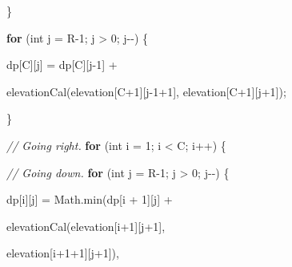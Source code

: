 \documentclass[
]{article}
\newenvironment{Shaded}{}{}
\newcommand{\BuiltInTok}[1]{#1}
\newcommand{\CommentTok}[1]{\textcolor[rgb]{0.38,0.63,0.69}{\textit{#1}}}
\newcommand{\ControlFlowTok}[1]{\textcolor[rgb]{0.00,0.44,0.13}{\textbf{#1}}}
\newcommand{\DataTypeTok}[1]{\textcolor[rgb]{0.56,0.13,0.00}{#1}}
\newcommand{\DecValTok}[1]{\textcolor[rgb]{0.25,0.63,0.44}{#1}}
\newcommand{\FunctionTok}[1]{\textcolor[rgb]{0.02,0.16,0.49}{#1}}
\newcommand{\NormalTok}[1]{#1}
\newcommand{\OperatorTok}[1]{\textcolor[rgb]{0.40,0.40,0.40}{#1}}
\begin{document}
\begin{Shaded}
\begin{Highlighting}[]
    \OperatorTok{\}}

    \ControlFlowTok{for} \OperatorTok{(}\DataTypeTok{int}\NormalTok{ j }\OperatorTok{=}\NormalTok{ R}\OperatorTok{{-}}\DecValTok{1}\OperatorTok{;}\NormalTok{ j }\OperatorTok{\textgreater{}} \DecValTok{0}\OperatorTok{;}\NormalTok{ j}\OperatorTok{{-}{-})} \OperatorTok{\{}

\NormalTok{        dp}\OperatorTok{[}\NormalTok{C}\OperatorTok{][}\NormalTok{j}\OperatorTok{]} \OperatorTok{=}\NormalTok{ dp}\OperatorTok{[}\NormalTok{C}\OperatorTok{][}\NormalTok{j}\OperatorTok{{-}}\DecValTok{1}\OperatorTok{]} \OperatorTok{+} 

            \FunctionTok{elevationCal}\OperatorTok{(}\NormalTok{elevation}\OperatorTok{[}\NormalTok{C}\OperatorTok{+}\DecValTok{1}\OperatorTok{][}\NormalTok{j}\OperatorTok{{-}}\DecValTok{1}\OperatorTok{+}\DecValTok{1}\OperatorTok{],}\NormalTok{ elevation}\OperatorTok{[}\NormalTok{C}\OperatorTok{+}\DecValTok{1}\OperatorTok{][}\NormalTok{j}\OperatorTok{+}\DecValTok{1}\OperatorTok{]);}

    \OperatorTok{\}}

    \CommentTok{// Going right.
}
    \ControlFlowTok{for} \OperatorTok{(}\DataTypeTok{int}\NormalTok{ i }\OperatorTok{=} \DecValTok{1}\OperatorTok{;}\NormalTok{ i }\OperatorTok{\textless{}}\NormalTok{ C}\OperatorTok{;}\NormalTok{ i}\OperatorTok{++)} \OperatorTok{\{}

        \CommentTok{// Going down.
}
        \ControlFlowTok{for} \OperatorTok{(}\DataTypeTok{int}\NormalTok{ j }\OperatorTok{=}\NormalTok{ R}\OperatorTok{{-}}\DecValTok{1}\OperatorTok{;}\NormalTok{ j }\OperatorTok{\textgreater{}} \DecValTok{0}\OperatorTok{;}\NormalTok{ j}\OperatorTok{{-}{-})} \OperatorTok{\{}

\NormalTok{            dp}\OperatorTok{[}\NormalTok{i}\OperatorTok{][}\NormalTok{j}\OperatorTok{]} \OperatorTok{=} \BuiltInTok{Math}\OperatorTok{.}\FunctionTok{min}\OperatorTok{(}\NormalTok{dp}\OperatorTok{[}\NormalTok{i }\OperatorTok{+} \DecValTok{1}\OperatorTok{][}\NormalTok{j}\OperatorTok{]} \OperatorTok{+} 

                                \FunctionTok{elevationCal}\OperatorTok{(}\NormalTok{elevation}\OperatorTok{[}\NormalTok{i}\OperatorTok{+}\DecValTok{1}\OperatorTok{][}\NormalTok{j}\OperatorTok{+}\DecValTok{1}\OperatorTok{],} 

\NormalTok{                                             elevation}\OperatorTok{[}\NormalTok{i}\OperatorTok{+}\DecValTok{1}\OperatorTok{+}\DecValTok{1}\OperatorTok{][}\NormalTok{j}\OperatorTok{+}\DecValTok{1}\OperatorTok{]),} 


\end{Highlighting}
\end{Shaded}
\end{document}
